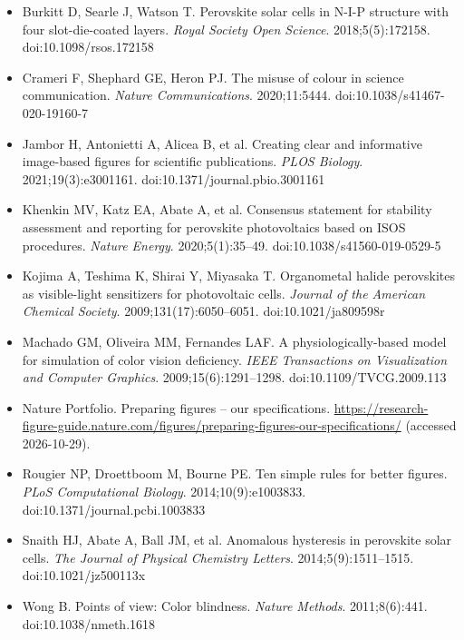 \begin{itemize}
\item Burkitt D, Searle J, Watson T. Perovskite solar cells in N-I-P structure with four slot-die-coated layers. \textit{Royal Society Open Science}. 2018;5(5):172158. doi:10.1098/\allowbreak rsos.172158
\item Crameri F, Shephard GE, Heron PJ. The misuse of colour in science communication. \textit{Nature Communications}. 2020;11:5444. doi:10.1038/\allowbreak s41467-020-19160-7
\item Jambor H, Antonietti A, Alicea B, et al. Creating clear and informative image-based figures for scientific publications. \textit{PLOS Biology}. 2021;19(3):e3001161. doi:10.1371/\allowbreak journal.pbio.3001161
\item Khenkin MV, Katz EA, Abate A, et al. Consensus statement for stability assessment and reporting for perovskite photovoltaics based on ISOS procedures. \textit{Nature Energy}. 2020;5(1):35--49. doi:10.1038/\allowbreak s41560-019-0529-5
\item Kojima A, Teshima K, Shirai Y, Miyasaka T. Organometal halide perovskites as visible-light sensitizers for photovoltaic cells. \textit{Journal of the American Chemical Society}. 2009;131(17):6050--6051. doi:10.1021/\allowbreak ja809598r
\item Machado GM, Oliveira MM, Fernandes LAF. A physiologically-based model for simulation of color vision deficiency. \textit{IEEE Transactions on Visualization and Computer Graphics}. 2009;15(6):1291--1298. doi:10.1109/\allowbreak TVCG.2009.113
\item Nature Portfolio. Preparing figures -- our specifications. \url{https://research-figure-guide.nature.com/figures/preparing-figures-our-specifications/} (accessed 2026-10-29).
\item Rougier NP, Droettboom M, Bourne PE. Ten simple rules for better figures. \textit{PLoS Computational Biology}. 2014;10(9):e1003833. doi:10.1371/\allowbreak journal.pcbi.1003833
\item Snaith HJ, Abate A, Ball JM, et al. Anomalous hysteresis in perovskite solar cells. \textit{The Journal of Physical Chemistry Letters}. 2014;5(9):1511--1515. doi:10.1021/\allowbreak jz500113x
\item Wong B. Points of view: Color blindness. \textit{Nature Methods}. 2011;8(6):441. doi:10.1038/\allowbreak nmeth.1618
\end{itemize}

